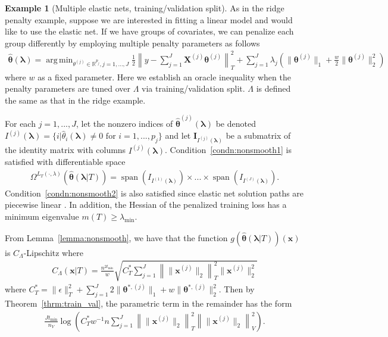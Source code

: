 \documentclass[12pt]{article} %
\theoremstyle{definition}
\newtheorem{example}{Example}
\DeclareMathOperator{\spann}{span}
\DeclareMathOperator*{\argmin}{arg\,min}
\begin{document}
\begin{example}[Multiple elastic nets, training/validation split]
	\label{ex:elastic_net_tv}
	As in the ridge penalty example, suppose we are interested in fitting a linear model and would like to use the elastic net.
	If we have groups of covariates, we can penalize each group differently by employing multiple penalty parameters as follows
	\begin{align}
	\hat{\boldsymbol{\theta}}(\boldsymbol{\lambda})
	=\argmin_{\theta^{(j)} \in \mathbb{R}^{p_j}, j = 1,...,J}
	\frac{1}{2} \left \| y - \sum_{j=1}^J \boldsymbol{X}^{(j)} \boldsymbol{\theta}^{(j)} \right \|_T^2
	+ \sum_{j=1}^J \lambda_j \left(
	\| \boldsymbol{\theta}^{(j)}\|_1
	+ \frac{w}{2} \| \boldsymbol{\theta}^{(j)}\|_2^2
	\right)
	\label{eq:elastic_net_ex}
	\end{align}
	where $w$ as a fixed parameter.
	Here we establish an oracle inequality when the penalty parameters are tuned over $\Lambda$ via training/validation split.
	$\Lambda$ is defined the same as that in the ridge example.
	
	For each $j = 1,...,J$, let the nonzero indices of $\hat{\boldsymbol{\theta}}^{(j)}(\boldsymbol{\lambda})$ be denoted $I^{(j)}(\boldsymbol\lambda) = \{i | \hat{\theta}_i(\boldsymbol\lambda) \ne 0 \text{ for } i=1,...,p_j \}$ and let $\boldsymbol I_{I^{(j)}(\boldsymbol \lambda)}$ be a submatrix of the identity matrix with columns $I^{(j)}(\boldsymbol\lambda)$.
	Condition~\ref{condn:nonsmooth1} is satisfied with differentiable space
	\begin{align}
	\Omega^{L_T(\cdot, \lambda)}(\hat{\boldsymbol{\theta}}(\boldsymbol{\lambda} | T))
	= \spann(I_{I^{(1)}(\boldsymbol \lambda)}) \times ... \times \spann(I_{I^{(J)}(\boldsymbol \lambda)}).
	\label{eq:en_diff_space}
	\end{align}
	Condition~\ref{condn:nonsmooth2} is also satisfied since elastic net solution paths are piecewise linear \citep{zou2003regression}.
	In addition, the Hessian of the penalized training loss has a minimum eigenvalue $m(T) \ge \lambda_{\min}$.

	From Lemma~\ref{lemma:nonsmooth}, we have that the function $g(\hat{\boldsymbol{\theta}}(\boldsymbol{\lambda} |T))(\boldsymbol{x})$ is $C_\Lambda$-Lipschitz where
	\begin{align}
	C_\Lambda \left ( \boldsymbol{x} | T \right ) =
	\frac{n^{2t_{\min}}}{w}
	\sqrt{
	C^*_T
	\sum_{j = 1}^J
	\left \|
	\|\boldsymbol{x}^{(j)} \|_2
	\right \|_T^2
	\|\boldsymbol{x}^{(j)}\|_2^2
	}
	\label{eq:elastic_lipschitz}
	\end{align}
	where
	$
	C^*_T =
	\|\epsilon\|_{T}^{2}
	+\sum_{j=1}^J
	2 \|\boldsymbol{\theta}^{*,(j)}\|_1
	+ w\|\boldsymbol{\theta}^{*,(j)}\|_2^2
	$.
	Then by Theorem~\ref{thrm:train_val}, the parametric term in the remainder has the form
	\begin{align}
	\frac{J t_{\min}}{n_{V}}
	\log \left (
	C^*_T
	w^{-1} n
	\sum_{j=1}^J
	\left \| \|\boldsymbol{x}^{(j)}\|_2 \right \|_T^2 \left \| \|\boldsymbol{x}^{(j)}\|_2 \right \|_V^2
	\right ).
	\end{align}
\end{example}
\end{document}
